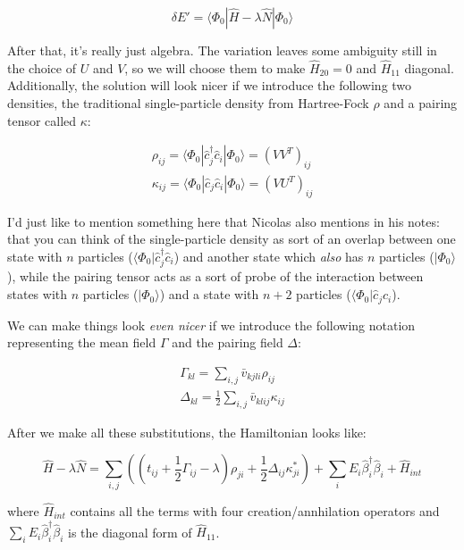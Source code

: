 \begin{equation}
\delta E' = \langle\Phi_0|\hat{H}-\lambda\hat{N}|\Phi_0\rangle
\end{equation}

After that, it's really just algebra. The variation leaves some ambiguity still in the choice of $U$ and $V$, so we will choose them to make $\hat{H}_{20}=0$ and $\hat{H}_{11}$ diagonal. Additionally, the solution will look nicer if we introduce the following two densities, the traditional single-particle density from Hartree-Fock $\rho$ and a pairing tensor called $\kappa$:

\begin{eqnarray}
\rho_{ij} = \langle\Phi_0|\hat{c}_j^\dagger\hat{c}_i|\Phi_0\rangle = (VV^T)_{ij} \\
\kappa_{ij} = \langle\Phi_0|\hat{c}_j\hat{c}_i|\Phi_0\rangle = (VU^T)_{ij}
\end{eqnarray}

\noindent I'd just like to mention something here that Nicolas also mentions in his notes: that you can think of the single-particle density as sort of an overlap between one state with $n$ particles ($\langle\Phi_0|\hat{c}_j^\dagger\hat{c}_i$) and another state which \textit{also} has $n$ particles ($|\Phi_0\rangle$), while the pairing tensor acts as a sort of probe of the interaction between states with $n$ particles ($|\Phi_0\rangle$) and a state with $n+2$ particles ($\langle\Phi_0|\hat{c}_j\hat{c}_i$).

We can make things look \textit{even nicer} if we introduce the following notation representing the mean field $\Gamma$ and the pairing field $\Delta$:

\begin{eqnarray}
\Gamma_{kl} = \sum_{i,j} \bar{v}_{kjli}\rho_{ij} \\
\Delta_{kl} = \frac{1}{2}\sum_{i,j} \bar{v}_{klij}\kappa_{ij}
\end{eqnarray}

After we make all these substitutions, the Hamiltonian looks like:

\begin{equation}
\hat{H}-\lambda\hat{N} = \sum\limits_{i,j}\left(\left(t_{ij} + \frac{1}{2}\Gamma_{ij} - \lambda \right) \rho_{ji} + \frac{1}{2}\Delta_{ij}\kappa_{ji}^* \right) + \sum_{i}E_i \hat{\beta}_i^\dagger\hat{\beta}_i + \hat{H}_{int}
\end{equation}

\noindent where $\hat{H}_{int}$ contains all the terms with four creation/annhilation operators and $\sum_{i}E_i \hat{\beta}_i^\dagger\hat{\beta}_i$ is the diagonal form of $\hat{H}_{11}$.

